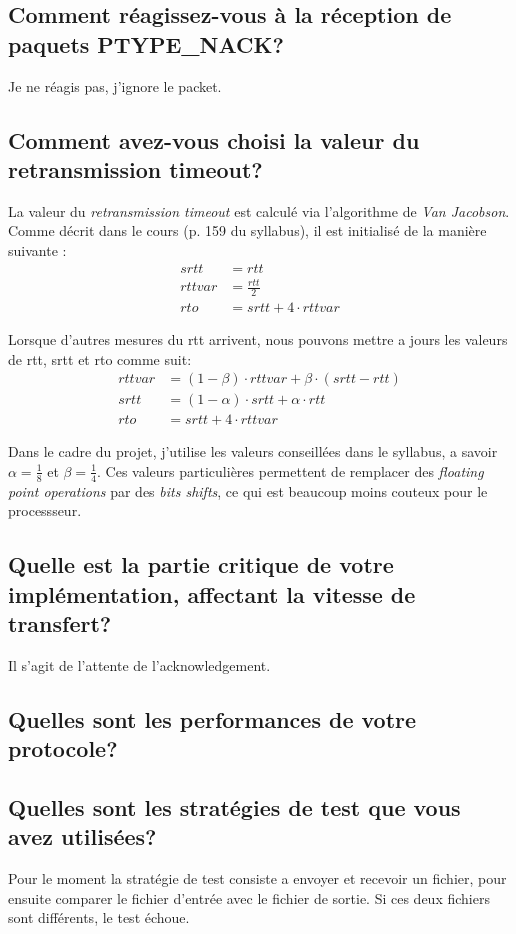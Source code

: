 \documentclass[10pt,a4paper]{article}
\begin{document}
\subsection{Comment réagissez-vous à la réception de paquets PTYPE\_NACK?}
Je ne réagis pas, j'ignore le packet.


\subsection{Comment avez-vous choisi la valeur du retransmission timeout?}
La valeur du \textit{retransmission timeout} est calculé via l'algorithme de \textit{Van Jacobson}. Comme décrit dans le cours (p. 159 du syllabus), il est initialisé de la manière suivante : 
\begin{align*}
	srtt &= rtt \\
	rttvar &= \frac{rtt}{2} \\
	rto &= srtt + 4 \cdot rttvar
\end{align*}

Lorsque d'autres mesures du rtt arrivent, nous pouvons mettre a jours les valeurs de rtt, srtt et rto comme suit:
\begin{align*}
	rttvar &= (1-\beta) \cdot rttvar + \beta \cdot (srtt - rtt) \\
	srtt &= (1-\alpha) \cdot srtt + \alpha \cdot rtt \\
	rto &= srtt + 4 \cdot rttvar
\end{align*}

Dans le cadre du projet, j'utilise les valeurs conseillées dans le syllabus, a savoir $\alpha = \frac{1}{8}$ et $\beta = \frac{1}{4}$. Ces valeurs particulières permettent de remplacer des \textit{floating point operations} par des \textit{bits shifts}, ce qui est beaucoup moins couteux pour le processseur.

\subsection{Quelle est la partie critique de votre implémentation, affectant la vitesse de transfert?}
Il s'agit de l'attente de l'acknowledgement.


\subsection{Quelles sont les performances de votre protocole?}

\subsection{Quelles sont les stratégies de test que vous avez utilisées?}
Pour le moment la stratégie de test consiste a envoyer et recevoir un fichier, pour ensuite comparer le fichier d'entrée avec le fichier de sortie. Si ces deux fichiers sont différents, le test échoue.
\end{document}
